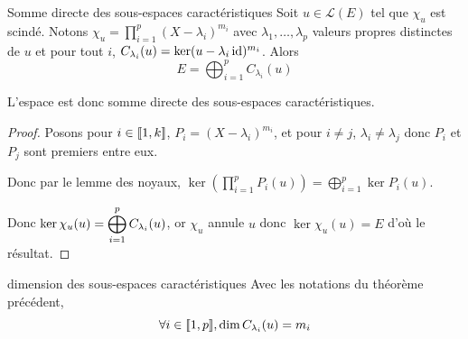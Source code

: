\begin{theoreme}{Somme directe des sous-espaces caractéristiques}{}
    Soit $u \in \mathscr L(E)$ tel que $\chi_u$ est scindé. Notons 
    $\chi_u = \displaystyle \prod_{i = 1 }^{ p } (X - \lambda_i)^{m_i}$ avec 
    $\lambda_1, \ldots, \lambda_p$ valeurs propres distinctes de $u$
    et pour tout $i$, $C_{\lambda_i}(u) = \ker (u - \lambda_i \operatorname{id})^{m_i}$.
    Alors $$E = \displaystyle \bigoplus_{i = 1 }^{ p } C_{\lambda_i}(u)$$

    L'espace est donc somme directe des sous-espaces caractéristiques.
\end{theoreme}


\begin{proof}
    Posons pour $i \in [\![1, k]\!] $, $P_i = (X - \lambda_i)^{m_i}$, et
    pour $i \neq j$, $\lambda_i \neq \lambda_j$ donc $P_i$ et $P_j$ sont premiers entre eux.

    Donc par le lemme des noyaux, $\displaystyle \ker \left(\prod_{i = 1 }^{ p } P_i(u) \right) = \bigoplus_{i = 1 }^{ p } \ker P_i(u)$.
    
    Donc $\displaystyle \ker \chi_u(u) = \bigoplus_{i = 1 }^{ p } C_{\lambda_i}(u)$, or $\chi_u$ annule $u$ donc 
    $\ker \chi_u(u) = E$ d'où le résultat.

\end{proof}

\begin{corollaire}{dimension des sous-espaces caractéristiques}{}
    Avec les notations du théorème précédent, $$\forall i \in [\![1, p]\!], 
    \dim C_{\lambda_i}(u) = m_i$$
\end{corollaire}

